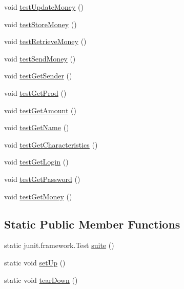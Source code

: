 \begin{DoxyCompactItemize}
\item 
void \hyperlink{classes_1_1deusto_1_1server_1_1_j_unit_test_aaad8cae59ca19f9dba654a12f695dbd0}{test\+Update\+Money} ()
\item 
void \hyperlink{classes_1_1deusto_1_1server_1_1_j_unit_test_a6863eca45b97fd4cce293b9ee705da6f}{test\+Store\+Money} ()
\item 
void \hyperlink{classes_1_1deusto_1_1server_1_1_j_unit_test_acd22c583e2d8276c76df148ddca3d716}{test\+Retrieve\+Money} ()
\item 
void \hyperlink{classes_1_1deusto_1_1server_1_1_j_unit_test_a3d96e27fee6cffb14a0f43b9516c9eb9}{test\+Send\+Money} ()
\item 
void \hyperlink{classes_1_1deusto_1_1server_1_1_j_unit_test_a7f488e3ee6b4751aaffd8ac74edc828d}{test\+Get\+Sender} ()
\item 
void \hyperlink{classes_1_1deusto_1_1server_1_1_j_unit_test_a545a0934031db41d9333d9106c050ae4}{test\+Get\+Prod} ()
\item 
void \hyperlink{classes_1_1deusto_1_1server_1_1_j_unit_test_aad5e9f503b6938b10c7935af68ae99fa}{test\+Get\+Amount} ()
\item 
void \hyperlink{classes_1_1deusto_1_1server_1_1_j_unit_test_a9e4938a911e40d6f36531639482d09a8}{test\+Get\+Name} ()
\item 
void \hyperlink{classes_1_1deusto_1_1server_1_1_j_unit_test_adfe6c8de32fe489f31f62338a475729e}{test\+Get\+Characteristics} ()
\item 
void \hyperlink{classes_1_1deusto_1_1server_1_1_j_unit_test_a6c7354d3207f6f6e8778d1b85fd31746}{test\+Get\+Login} ()
\item 
void \hyperlink{classes_1_1deusto_1_1server_1_1_j_unit_test_aac72817037da417d5eb5b32078971398}{test\+Get\+Password} ()
\item 
void \hyperlink{classes_1_1deusto_1_1server_1_1_j_unit_test_a6204483b84dccff7e6dd2e98d9b20b1b}{test\+Get\+Money} ()
\end{DoxyCompactItemize}
\subsection*{Static Public Member Functions}
\begin{DoxyCompactItemize}
\item 
static junit.\+framework.\+Test \hyperlink{classes_1_1deusto_1_1server_1_1_j_unit_test_ae981ce8acebd33a65ebe3160ceeac17b}{suite} ()
\item 
static void \hyperlink{classes_1_1deusto_1_1server_1_1_j_unit_test_af386e60b196afb70391c05e71563efd6}{set\+Up} ()
\item 
static void \hyperlink{classes_1_1deusto_1_1server_1_1_j_unit_test_a6773c13994c33488b0f6ca363c92417a}{tear\+Down} ()
\end{DoxyCompactItemize}


